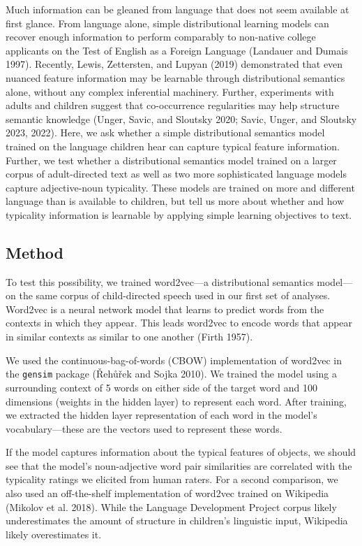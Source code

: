 \documentclass{ucetd}
\begin{document}
Much information can be gleaned from language that does not seem
available at first glance. From language alone, simple distributional
learning models can recover enough information to perform comparably to
non-native college applicants on the Test of English as a Foreign
Language (Landauer and Dumais 1997). Recently, Lewis, Zettersten, and
Lupyan (2019) demonstrated that even nuanced feature information may be
learnable through distributional semantics alone, without any complex
inferential machinery. Further, experiments with adults and children
suggest that co-occurrence regularities may help structure semantic
knowledge (Unger, Savic, and Sloutsky 2020; Savic, Unger, and Sloutsky
2023, 2022). Here, we ask whether a simple distributional semantics
model trained on the language children hear can capture typical feature
information. Further, we test whether a distributional semantics model
trained on a larger corpus of adult-directed text as well as two more
sophisticated language models capture adjective-noun typicality. These
models are trained on more and different language than is available to
children, but tell us more about whether and how typicality information
is learnable by applying simple learning objectives to text.

\hypertarget{method}{%
\subsection{Method}\label{method}}

To test this possibility, we trained word2vec---a distributional
semantics model---on the same corpus of child-directed speech used in
our first set of analyses. Word2vec is a neural network model that
learns to predict words from the contexts in which they appear. This
leads word2vec to encode words that appear in similar contexts as
similar to one another (Firth 1957).

We used the continuous-bag-of-words (CBOW) implementation of word2vec in
the \texttt{gensim} package (Řehůřek and Sojka 2010). We trained the
model using a surrounding context of 5 words on either side of the
target word and 100 dimensions (weights in the hidden layer) to
represent each word. After training, we extracted the hidden layer
representation of each word in the model's vocabulary---these are the
vectors used to represent these words.

If the model captures information about the typical features of objects,
we should see that the model's noun-adjective word pair similarities are
correlated with the typicality ratings we elicited from human raters.
For a second comparison, we also used an off-the-shelf implementation of
word2vec trained on Wikipedia (Mikolov et al. 2018). While the Language
Development Project corpus likely underestimates the amount of structure
in children's linguistic input, Wikipedia likely overestimates it.
\end{document}
